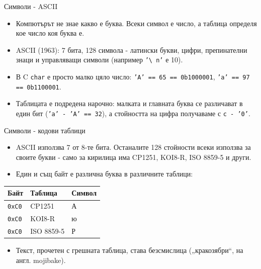 \documentclass[14pt, aspectratio=169]{beamer}
\begin{document}
\begin{frame}{Символи - ASCII}
  \begin{itemize}
    \item Компютърът не знае какво е буква. Всеки символ е число, а таблица
      определя кое число коя буква е.
    \item ASCII (1963): 7 бита, 128 символа - латински букви, цифри,
      препинателни знаци и управляващи символи (например \texttt{'\textbackslash
        n'} е 10).
    \item В C \texttt{char} е просто малко цяло число:
      \texttt{'A' == 65 == 0b1000001}, \texttt{'a' == 97 == 0b1100001}.
    \item Таблицата е подредена нарочно: малката и главната буква се различават
      в един бит (\texttt{'a' - 'A' == 32}), а стойността на цифра получаваме с
      \texttt{c - '0'}.
  \end{itemize}
\end{frame}

\begin{frame}{Символи - кодови таблици}
  \begin{itemize}
    \item ASCII използва 7 от 8-те бита. Останалите 128 стойности всеки
      използва за своите букви - само за кирилица има CP1251, KOI8-R, ISO
      8859-5 и други.
    \item Един и същ байт е различна буква в различните таблици:
  \end{itemize}
  \seg
  \begin{center}
    \small
    \begin{tabular}{@{}lll@{}}
      \toprule
      \textbf{Байт} & \textbf{Таблица} & \textbf{Символ} \\
      \midrule
      \texttt{0xC0} & CP1251 & А \\
      \texttt{0xC0} & KOI8-R & ю \\
      \texttt{0xC0} & ISO 8859-5 & Р \\
      \bottomrule
    \end{tabular}
  \end{center}
  \begin{itemize}
    \item Текст, прочетен с грешната таблица, става безсмислица
      („кракозябри“, на англ. mojibake).
  \end{itemize}
\end{frame}
\end{document}
